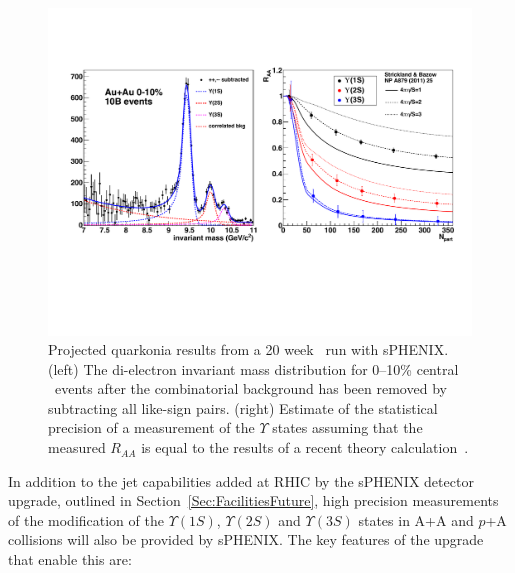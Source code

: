 \begin{figure}[!pht]
  \centering
      \includegraphics[width=\textwidth]{fig/upsilon_combined}
      \caption[Projected quarkonia results from a 20 week \AuAu\ run
        with sPHENIX]{Projected quarkonia results from a 20 week \AuAu\ run
        with sPHENIX.  (left) The di-electron invariant mass
        distribution for 0--10\% central \AuAu\ events after the
        combinatorial background has been removed by subtracting all
        like-sign pairs. (right) Estimate of the statistical
        precision of a measurement of the $\Upsilon$ states assuming
        that the measured $R_{AA}$ is equal to the results of a
        recent theory calculation~\cite{Strickland:2011aa}.}
\label{Fig:upsilon_auau_0-10pc}
\label{Fig:upsilon_raa}
\end{figure}

In addition to the jet capabilities added at RHIC by the sPHENIX detector upgrade, 
outlined in Section~\ref{Sec:FacilitiesFuture}, high precision
measurements of the modification of the $\Upsilon(1S)$, $\Upsilon(2S)$ and $\Upsilon(3S)$
states in A+A and $p$+A collisions will also be provided by sPHENIX. The key features 
of the upgrade that enable this are:

